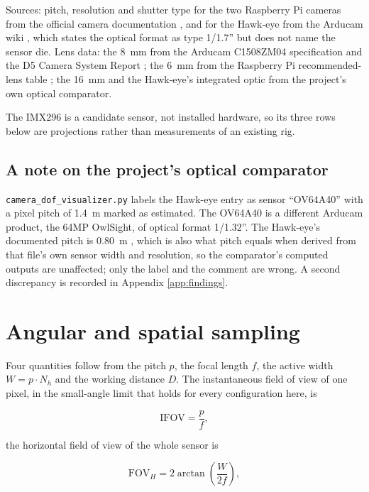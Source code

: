 Sources: pitch, resolution and shutter type for the two Raspberry Pi cameras from the official camera documentation \cite{raspberrypi_camera_docs}, and for the Hawk-eye from the Arducam wiki \cite{arducam_hawkeye_wiki}, which states the optical format as type 1/1.7'' but does not name the sensor die. Lens data: the 8~mm from the Arducam C1508ZM04 specification \cite{arducam_c1508zm04} and the D5 Camera System Report \cite{linku_d5_camera_report}; the 6~mm from the Raspberry Pi recommended-lens table \cite{raspberrypi_camera_docs}; the 16~mm and the Hawk-eye's integrated optic from the project's own optical comparator.

The IMX296 is a candidate sensor, not installed hardware, so its three rows below are projections rather than measurements of an existing rig.

\subsection{A note on the project's optical comparator}

\texttt{camera\_dof\_visualizer.py} labels the Hawk-eye entry as sensor ``OV64A40'' with a pixel pitch of 1.4~\textmu m marked as estimated. The OV64A40 is a different Arducam product, the 64MP OwlSight, of optical format 1/1.32''. The Hawk-eye's documented pitch is 0.80~\textmu m \cite{arducam_hawkeye_wiki}, which is also what pitch equals when derived from that file's own sensor width and resolution, so the comparator's computed outputs are unaffected; only the label and the comment are wrong. A second discrepancy is recorded in Appendix \ref{app:findings}.

\section{Angular and spatial sampling}

Four quantities follow from the pitch $p$, the focal length $f$, the active width $W = p \cdot N_h$ and the working distance $D$. The instantaneous field of view of one pixel, in the small-angle limit that holds for every configuration here, is

\begin{equation}
\mathrm{IFOV} = \frac{p}{f} ,
\label{eq:ifov}
\end{equation}

the horizontal field of view of the whole sensor is

\begin{equation}
\mathrm{FOV}_H = 2\arctan\!\left(\frac{W}{2f}\right) ,
\label{eq:fov}
\end{equation}


